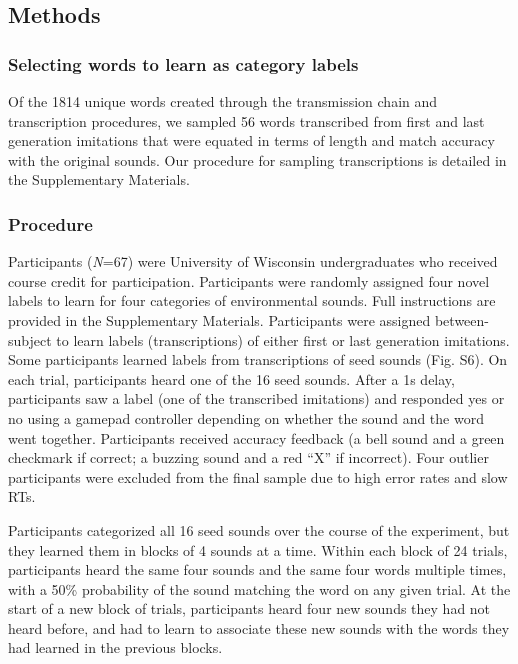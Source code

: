 \documentclass[english,floatsintext,man]{apa6}
\theoremstyle{definition}
\theoremstyle{definition}
\theoremstyle{definition}
\theoremstyle{remark}
\begin{document}
\hypertarget{methods-2}{%
\subsection{Methods}\label{methods-2}}

\hypertarget{selecting-words-to-learn-as-category-labels}{%
\subsubsection{Selecting words to learn as category
labels}\label{selecting-words-to-learn-as-category-labels}}

Of the 1814 unique words created through the transmission chain and
transcription procedures, we sampled 56 words transcribed from first and
last generation imitations that were equated in terms of length and
match accuracy with the original sounds. Our procedure for sampling
transcriptions is detailed in the Supplementary Materials.

\hypertarget{procedure}{%
\subsubsection{Procedure}\label{procedure}}

Participants (\emph{N}=67) were University of Wisconsin undergraduates
who received course credit for participation. Participants were randomly
assigned four novel labels to learn for four categories of environmental
sounds. Full instructions are provided in the Supplementary Materials.
Participants were assigned between-subject to learn labels
(transcriptions) of either first or last generation imitations. Some
participants learned labels from transcriptions of seed sounds (Fig.
S6). On each trial, participants heard one of the 16 seed sounds. After
a 1s delay, participants saw a label (one of the transcribed imitations)
and responded yes or no using a gamepad controller depending on whether
the sound and the word went together. Participants received accuracy
feedback (a bell sound and a green checkmark if correct; a buzzing sound
and a red \enquote{X} if incorrect). Four outlier participants were
excluded from the final sample due to high error rates and slow RTs.

Participants categorized all 16 seed sounds over the course of the
experiment, but they learned them in blocks of 4 sounds at a time.
Within each block of 24 trials, participants heard the same four sounds
and the same four words multiple times, with a 50\% probability of the
sound matching the word on any given trial. At the start of a new block
of trials, participants heard four new sounds they had not heard before,
and had to learn to associate these new sounds with the words they had
learned in the previous blocks.
\end{document}
